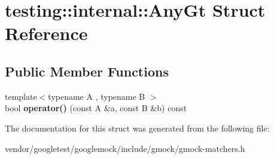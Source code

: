 \hypertarget{structtesting_1_1internal_1_1_any_gt}{}\section{testing\+:\+:internal\+:\+:Any\+Gt Struct Reference}
\label{structtesting_1_1internal_1_1_any_gt}
\subsection*{Public Member Functions}
\begin{DoxyCompactItemize}
\item 
\mbox{\label{structtesting_1_1internal_1_1_any_gt_a710d341cb9f9d1a44ed7233409461dd6}} 
{\footnotesize template$<$typename A , typename B $>$ }\\bool {\bfseries operator()} (const A \&a, const B \&b) const
\end{DoxyCompactItemize}


The documentation for this struct was generated from the following file\+:\begin{DoxyCompactItemize}
\item 
vendor/googletest/googlemock/include/gmock/gmock-\/matchers.\+h\end{DoxyCompactItemize}
